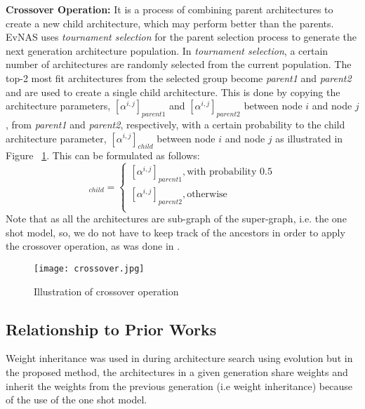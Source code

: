 \documentclass[final]{cvpr}
\begin{document}
\textbf{Crossover Operation:} It is a process of combining parent architectures
to create a new child architecture, which may perform better than the parents.
EvNAS uses \textit{tournament selection} \cite{eiben2003introduction} for the parent
selection process to generate the next generation architecture population. In
\textit{tournament selection}, a certain number of architectures are randomly selected
from the current population. The top-2 most fit architectures from the 
selected group become \textit{parent1} and \textit{parent2} and are used to create 
a single child architecture. This is done by copying the architecture 
parameters, $[{\alpha}^{i,j}]_{parent1}$ and $[{\alpha}^{i,j}]_{parent2}$ between node $i$ and
node $j$, from \textit{parent1} and \textit{parent2}, respectively, with a certain probability
to the child architecture parameter, $[{\alpha}^{i,j}]_{child}$ between node $i$ and node $j$
as illustrated in Figure ~\ref{fig:crossover}. This can be formulated as follows:
    \begin{equation}
        [{\alpha}^{i,j}]_{child} = 
            \begin{cases}
            [{\alpha}^{i,j}]_{parent1}, \text{with probability 0.5}
            \\
            [{\alpha}^{i,j}]_{parent2},  \text{otherwise}
            \\
            \end{cases}    
    \end{equation}
Note that as all the architectures are sub-graph of the super-graph, i.e. the one shot
model, so, we do not have to keep track of the ancestors in order to apply the crossover
operation, as was done in \cite{zhu2019eena}\cite{stanley2002evolving}.

\begin{figure}[h]
\begin{center}
\texttt{[image: crossover.jpg]}
  \end{center}
  \caption{Illustration of crossover operation}
  \label{fig:crossover}
  \end{figure}

\subsection{Relationship to Prior Works}
Weight inheritance was used in \cite{real2017large} during architecture search
using evolution but in the proposed method, the architectures in a given generation
share weights and inherit the weights from the previous generation (i.e weight
inheritance) because of the use of the one shot model.
\end{document}
